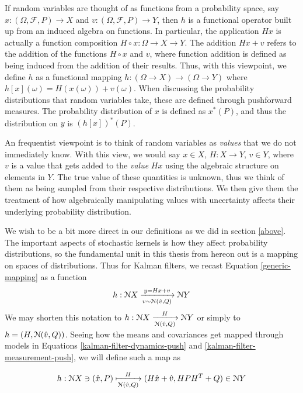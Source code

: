 If random variables are thought of as functions from a probability space, say $x:(\Omega,\mathcal{F}, P)\rightarrow X$ and $v:(\Omega,\mathcal{F}, P)\rightarrow Y$, then $h$ is a functional operator built up from an induced algebra on functions. In particular, the application $Hx$ is actually a function composition $H\circ x : \Omega \rightarrow X \rightarrow Y$. The addition $Hx + v$ refers to the addition of the functions $H\circ x$ and $v$, where function addition is defined as being induced from the addition of their results. Thus, with this viewpoint, we define $h$ as a functional mapping $h:(\Omega\rightarrow X) \rightarrow (\Omega\rightarrow Y)$ where $h[x](\omega) = H(x(\omega)) + v(\omega)$. When discussing the probability distributions that random variables take, these are defined through pushforward measures. The probability distribution of $x$ is defined as $x^*(P)$, and thus the distribution on $y$ is $(h[x])^*(P)$.

An frequentist viewpoint is to think of random variables as \emph{values} that we do not immediately know. With this view, we would say $x\in X$, $H:X\rightarrow Y$, $v\in Y$, where $v$ is a value that gets added to the \emph{value} $Hx$ using the algebraic structure on elements in $Y$. The true value of these quantities is unknown, thus we think of them as being sampled from their respective distributions. We then give them the treatment of how algebraically manipulating values with uncertainty affects their underlying probability distribution.

We wish to be a bit more direct in our definitions as we did in section \ref{above}. The important aspects of stochastic kernels is how they affect probability distributions, so the fundamental unit in this thesis from hereon out is a mapping on spaces of distributions. Thus for Kalman filters, we recast Equation \ref{generic-mapping} as a function
\begin{equation}
	h:\mathcal{N} X\xrightarrow[v\sim\mathcal{N}(\hat{v},Q)]{y = Hx + v} \mathcal{N} Y
\end{equation}
We may shorten this notation to $h:\mathcal{N} X \xrightarrow[\mathcal{N}(\hat{v},Q)]{H} \mathcal{N} Y$ or simply to $h = (H, \mathcal{N}(\hat{v},Q))$.
Seeing how the means and covariances get mapped through models in Equations \ref{kalman-filter-dynamics-push} and \ref{kalman-filter-measurement-push}, we will define such a map as

\begin{equation}
	\label{gaussian-map}
	h:\mathcal{N} X\ni (\hat{x},P) \xmapsto[\mathcal{N}(\hat{v}, Q)]{H} (H\hat{x} + \hat{v}, HPH^T + Q) \in \mathcal{N} Y
\end{equation}


